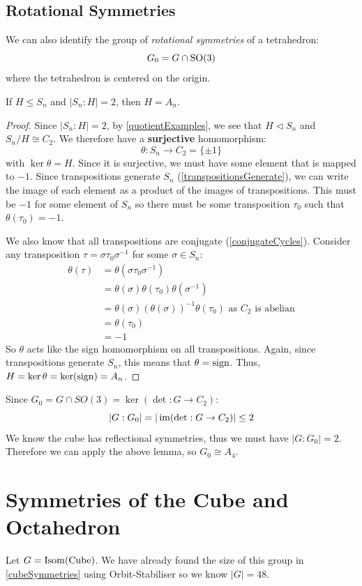\documentclass[../main.tex]{subfiles}
\begin{document}
\subsection{Rotational Symmetries}
We can also identify the group of \textit{rotational symmetries} of a tetrahedron:
\[
  G_0 = G \cap \mathrm{SO}(3)
\]
where the tetrahedron is centered on the origin.
\begin{lemma}[Uniqueness of $A_n$]
  If $H \leq S_n$ and $|S_n : H| = 2$, then $H = A_n$.
\end{lemma}
\begin{proof}
  Since $|S_n : H| = 2$, by \cref{quotientExamples}, we see that $H \lhd S_n$ and $S_n / H \cong C_2$.
  We therefore have a \textbf{surjective} homomorphism:
  \[
    \theta: S_n \to C_2 = \{\pm 1\}
  \]
  with $\ker \theta = H$.
  Since it is surjective, we must have some element that is mapped to $-1$.
  Since transpositions generate $S_n$ (\cref{transpositionsGenerate}), we can write the image of each element as a product of the images of transpositions.
  This must be $-1$ for some element of $S_n$ so there must be some transposition $\tau_0$ such that $\theta(\tau_0) = -1$.

  We also know that all transpositions are conjugate (\cref{conjugateCycles}).
  Consider any transposition $\tau = \sigma \tau_0 \sigma^{-1}$ for some $\sigma \in S_n$:
  \begin{align*}
    \theta(\tau) &= \theta(\sigma \tau_0 \sigma^{-1}) \\
                 &= \theta(\sigma)\theta(\tau_0)\theta(\sigma^{-1}) \\
                 &= \theta(\sigma)(\theta(\sigma))^{-1}\theta(\tau_0) \text{ as $C_2$ is abelian}\\
                 &= \theta(\tau_0) \\
                 &= - 1
  \end{align*}
  So $\theta$ acts like the sign homomorphism on all transpositions.
  Again, since transpositions generate $S_n$, this means that $\theta = \operatorname{sign}$.
  Thus, $H = \ker \theta = \ker(\operatorname{sign}) = A_n$.
\end{proof}
Since $G_0 = G \cap SO(3) = \ker(\det: G \to C_2)$:
\[
  |G: G_0| = |\operatorname{im}(\det: G \to C_2)| \leq 2
\]
We know the cube has reflectional symmetries, thus we must have $|G: G_0| = 2$.
Therefore we can apply the above lemma, so $G_0 \cong A_4$.
\section{Symmetries of the Cube and Octahedron}
Let $G  = \operatorname{Isom}(\text{Cube})$.
We have already found the size of this group in \cref{cubeSymmetries} using Orbit-Stabiliser so we know $|G| = 48$.
\end{document}
